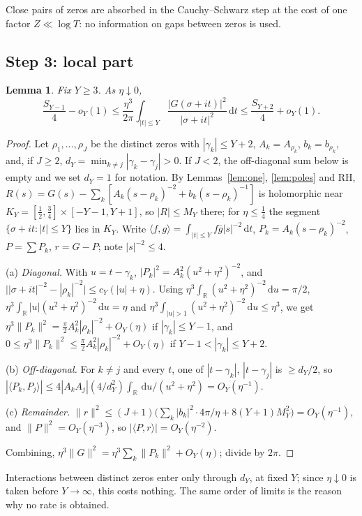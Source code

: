 \documentclass[11pt]{amsart}
\newtheorem{lemma}{Lemma}[section]
\theoremstyle{remark}
\theoremstyle{definition}
\newcommand{\dd}{\,\mathrm{d}}
\begin{document}
Close pairs of zeros are absorbed in the Cauchy--Schwarz step at the cost of one factor $Z\ll\log T$: no information on gaps between zeros is used.

\subsection*{Step 3: local part}
\begin{lemma}\label{lem:loc}
Fix $Y\ge3$. As $\eta\downarrow0$,
\[
\frac{S_{Y-1}}4-o_Y(1)\le\frac{\eta^3}{2\pi}\int_{|t|\le Y}\frac{|G(\sigma+it)|^2}{|\sigma+it|^2}\dd t\le\frac{S_{Y+2}}4+o_Y(1).
\]
\end{lemma}
\begin{proof}
Let $\rho_1,\dots,\rho_J$ be the distinct zeros with $|\gamma_k|\le Y+2$, $A_k=A_{\rho_k}$, $b_k=b_{\rho_k}$, and, if $J\ge2$, $d_Y=\min_{k\ne j}|\gamma_k-\gamma_j|>0$. If $J<2$, the off-diagonal sum below is empty and we set $d_Y=1$ for notation. By Lemmas~\ref{lem:one}, \ref{lem:poles} and RH, $R(s)=G(s)-\sum_k[A_k(s-\rho_k)^{-2}+b_k(s-\rho_k)^{-1}]$ is holomorphic near $K_Y=[\frac12,\frac34]\times[-Y-1,Y+1]$, so $|R|\le M_Y$ there; for $\eta\le\frac14$ the segment $\{\sigma+it:|t|\le Y\}$ lies in $K_Y$. Write $\langle f,g\rangle=\int_{|t|\le Y}f\bar g|s|^{-2}\dd t$, $P_k=A_k(s-\rho_k)^{-2}$, $P=\sum P_k$, $r=G-P$; note $|s|^{-2}\le4$.

(a) \emph{Diagonal.} With $u=t-\gamma_k$, $|P_k|^2=A_k^2(u^2+\eta^2)^{-2}$, and $\big||\sigma+it|^{-2}-|\rho_k|^{-2}\big|\le c_Y(|u|+\eta)$. Using $\eta^3\int_{\mathbb R}(u^2+\eta^2)^{-2}\dd u=\pi/2$, $\eta^3\int_{\mathbb R}|u|(u^2+\eta^2)^{-2}\dd u=\eta$ and $\eta^3\int_{|u|>1}(u^2+\eta^2)^{-2}\dd u\le\eta^3$, we get $\eta^3\|P_k\|^2=\frac\pi2A_k^2|\rho_k|^{-2}+O_Y(\eta)$ if $|\gamma_k|\le Y-1$, and $0\le\eta^3\|P_k\|^2\le\frac\pi2A_k^2|\rho_k|^{-2}+O_Y(\eta)$ if $Y-1<|\gamma_k|\le Y+2$.

(b) \emph{Off-diagonal.} For $k\ne j$ and every $t$, one of $|t-\gamma_k|$, $|t-\gamma_j|$ is $\ge d_Y/2$, so $|\langle P_k,P_j\rangle|\le4|A_kA_j|(4/d_Y^2)\int_{\mathbb R}\dd u/(u^2+\eta^2)=O_Y(\eta^{-1})$.

(c) \emph{Remainder.} $\|r\|^2\le(J+1)\big(\sum_k|b_k|^2\cdot4\pi/\eta+8(Y+1)M_Y^2\big)=O_Y(\eta^{-1})$, and $\|P\|^2=O_Y(\eta^{-3})$, so $|\langle P,r\rangle|=O_Y(\eta^{-2})$.

Combining, $\eta^3\|G\|^2=\eta^3\sum_k\|P_k\|^2+O_Y(\eta)$; divide by $2\pi$.
\end{proof}

Interactions between distinct zeros enter only through $d_Y$, at fixed $Y$; since $\eta\downarrow0$ is taken before $Y\to\infty$, this costs nothing. The same order of limits is the reason why no rate is obtained.
\end{document}
